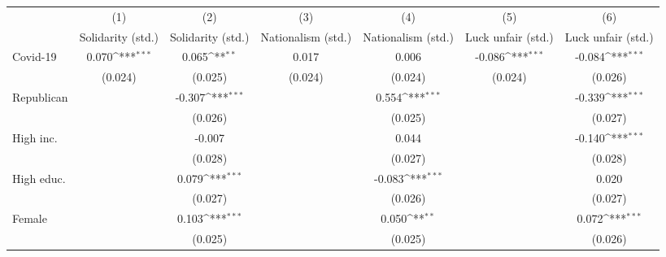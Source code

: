 {
\def\sym#1{\ifmmode^{#1}\else\(^{#1}\)\fi}
\begin{tabular}{l*{6}{c}}
\toprule
                    &\multicolumn{1}{c}{(1)}&\multicolumn{1}{c}{(2)}&\multicolumn{1}{c}{(3)}&\multicolumn{1}{c}{(4)}&\multicolumn{1}{c}{(5)}&\multicolumn{1}{c}{(6)}\\
                    &\multicolumn{1}{c}{Solidarity (std.)}&\multicolumn{1}{c}{Solidarity (std.)}&\multicolumn{1}{c}{Nationalism (std.)}&\multicolumn{1}{c}{Nationalism (std.)}&\multicolumn{1}{c}{Luck unfair (std.)}&\multicolumn{1}{c}{Luck unfair (std.)}\\
\midrule
Covid-19            &       0.070\sym{***}&       0.065\sym{**} &       0.017         &       0.006         &      -0.086\sym{***}&      -0.084\sym{***}\\
                    &     (0.024)         &     (0.025)         &     (0.024)         &     (0.024)         &     (0.024)         &     (0.026)         \\
\addlinespace
Republican          &                     &      -0.307\sym{***}&                     &       0.554\sym{***}&                     &      -0.339\sym{***}\\
                    &                     &     (0.026)         &                     &     (0.025)         &                     &     (0.027)         \\
\addlinespace
High inc.           &                     &      -0.007         &                     &       0.044         &                     &      -0.140\sym{***}\\
                    &                     &     (0.028)         &                     &     (0.027)         &                     &     (0.028)         \\
\addlinespace
High educ.          &                     &       0.079\sym{***}&                     &      -0.083\sym{***}&                     &       0.020         \\
                    &                     &     (0.027)         &                     &     (0.026)         &                     &     (0.027)         \\
\addlinespace
Female              &                     &       0.103\sym{***}&                     &       0.050\sym{**} &                     &       0.072\sym{***}\\
                    &                     &     (0.025)         &                     &     (0.025)         &                     &     (0.026)         \\

\end{tabular}}
